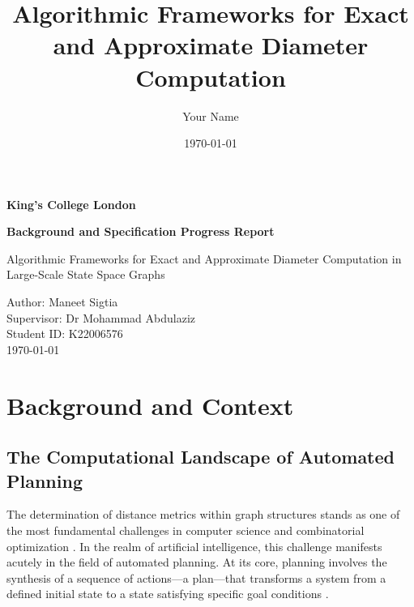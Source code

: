 \documentclass[12pt,a4paper]{report}
\title{\textbf{Algorithmic Frameworks for Exact and Approximate Diameter Computation}}
\author{Your Name}
\date{\today}
\begin{document}
\begin{titlepage}
  \centering
  \vspace*{1cm}
  
  {\LARGE \textbf{King's College London} \\[2cm]}

  {\Huge \textbf{Background and Specification Progress Report}\\[1cm]}

  {\Large Algorithmic Frameworks for Exact and Approximate Diameter Computation in Large-Scale State Space Graphs\\[2cm]}

  \vfill

  {\Large Author: Maneet Sigtia\\}
  {\Large Supervisor: Dr Mohammad Abdulaziz\\}
  {\large Student ID: K22006576 \\[1cm]}
  {\large \today}
\end{titlepage}


\tableofcontents
\clearpage


\chapter{Background and Context}

\section{The Computational Landscape of Automated Planning}
The determination of distance metrics within graph structures stands as one of the most fundamental challenges in computer science and combinatorial optimization \cite{graphsurvey}. In the realm of artificial intelligence, this challenge manifests acutely in the field of automated planning. At its core, planning involves the synthesis of a sequence of actions—a plan—that transforms a system from a defined initial state to a state satisfying specific goal conditions \cite{saarland}.
\end{document}
